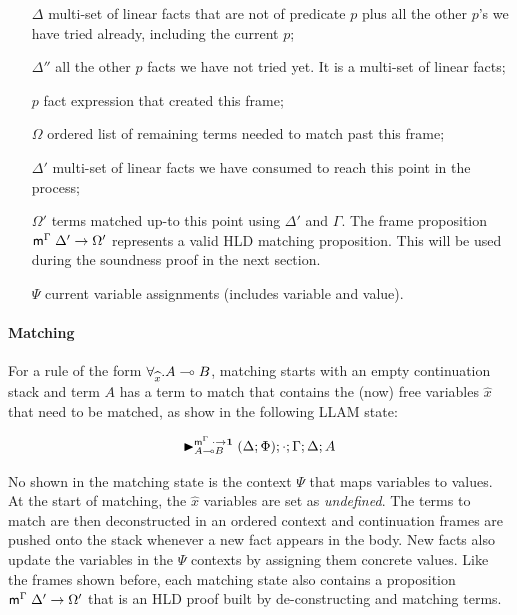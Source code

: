 \begin{enumerate}

  \item[$\Delta$] multi-set of linear facts that are not of predicate $p$ plus
all the other $p$'s we have tried already, including the current $p$;

  \item[$\Delta''$] all the other $p$ facts we have not tried yet. It is a multi-set
  of linear facts;

  \item[$p$] fact expression that created this frame;

  \item[$\Omega$] ordered list of remaining terms needed to match past this
  frame;

  \item[$\Delta'$] multi-set of linear facts we have consumed to reach this
     point in the process;

  \item[$\Omega'$] terms matched up-to this point using $\Delta'$ and $\Gamma$. 
The frame proposition $\mathsf{m}^{\Gamma} \; \Delta' \rightarrow \Omega'$ represents a valid HLD
matching proposition. This will be used during the soundness proof in the next
section.

   \item[$\Psi$] current variable assignments (includes variable and value).
     
\end{enumerate}

\paragraph{Matching} For a rule of the form $\forall_{\widehat{x}}. A \multimap B$,
matching starts with an empty continuation stack and term $A$ has a term to
match that contains the (now) free variables $\widehat{x}$ that need to be
matched, as show in the following LLAM state:

\vspace{-3mm}
\[
   {\blacktriangleright}_{A \multimap B}^{\mathsf{m}^\Gamma \; \cdot
   \rightarrow \mathbf{1}} \; (\Delta; \Phi); \cdot; \Gamma; \Delta; A
\]
\vspace{-3mm}

No shown in the matching state is the context $\Psi$ that maps variables to
values. At the start of matching, the $\widehat{x}$ variables are set as
\emph{undefined}. The terms to match are then deconstructed in an ordered
context and continuation frames are pushed onto the stack whenever a new fact
appears in the body. New facts also update the variables in the $\Psi$ contexts
by assigning them concrete values. Like the frames shown before, each matching
state also contains a proposition $\mathsf{m}^{\Gamma} \; \Delta' \rightarrow \Omega'$ that is an HLD
proof built by de-constructing and matching terms.

